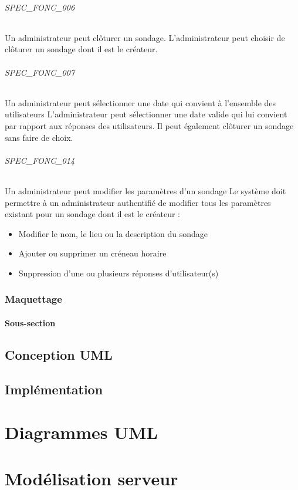 \documentclass[]{report}
\begin{document}
\paragraph{SPEC\_FONC\_006} Un administrateur peut clôturer un sondage. 
L’administrateur peut choisir de clôturer un sondage dont il est le créateur.

\paragraph{SPEC\_FONC\_007} Un administrateur peut sélectionner une date qui convient à l’ensemble des utilisateurs 
L’administrateur peut sélectionner une date valide qui lui convient par rapport aux réponses des utilisateurs. Il peut également clôturer un sondage sans faire de choix.

\paragraph{SPEC\_FONC\_014} Un administrateur peut modifier les paramètres d’un sondage
Le système doit permettre à un administrateur authentifié de modifier tous les paramètres existant pour un sondage dont il est le créateur : \begin{itemize}
\item Modifier le nom, le lieu ou la description du sondage
\item Ajouter ou supprimer un créneau horaire
\item Suppression d’une ou plusieurs réponses d’utilisateur(s) \end{itemize}

\section{Maquettage}

\subsection{Sous-section}

\chapter{Conception UML}

\chapter{Implémentation}

\part{Diagrammes UML}

\part{Modélisation serveur}
\end{document}
